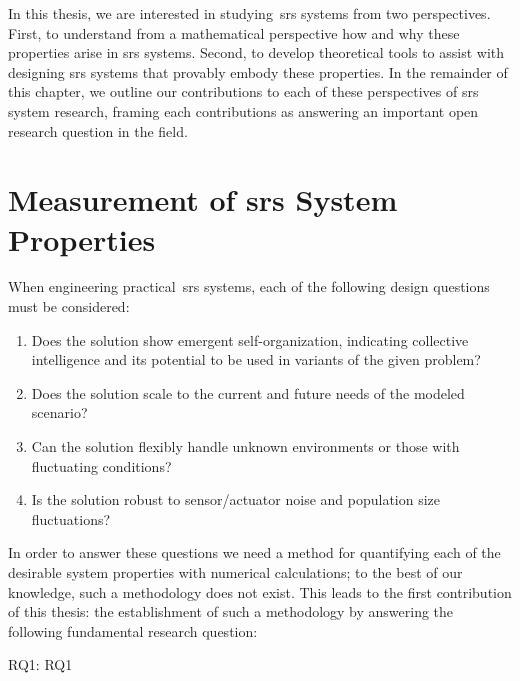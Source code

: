In this thesis, we are interested in studying~\gls{srs} systems from two
perspectives. First, to understand from a mathematical perspective how and why
these properties arise in \gls{srs} systems. Second, to develop theoretical tools
to assist with designing \gls{srs} systems that provably embody these properties.
In the remainder of this chapter, we outline our contributions to each of these
perspectives of \gls{srs} system research, framing each contributions as
answering an important open research question in the field.




\section{Measurement of \gls{srs} System Properties }
% 
When engineering practical~\gls{srs} systems, each of the following design
questions must be considered:
%
\begin{enumerate}
\item {Does the solution show emergent self-organization, indicating collective
    intelligence and its potential to be used in variants of the given problem?
  }
\item{Does the solution scale to the current and future needs of the modeled
    scenario?}
\item {Can the solution flexibly handle unknown environments or those with
    fluctuating conditions?}

\item {Is the solution robust to sensor/actuator noise and population size
    fluctuations?
  }
\end{enumerate}
%
In order to answer these questions we need a method for quantifying
each of the desirable system properties with numerical calculations; to the best
of our knowledge, such a methodology does not exist. This leads to the first
contribution of this thesis: the establishment of such a methodology by
answering the following fundamental research question:

\medskip\noindent
\gls{RQ1}: \glsdesc{RQ1}
\medskip


